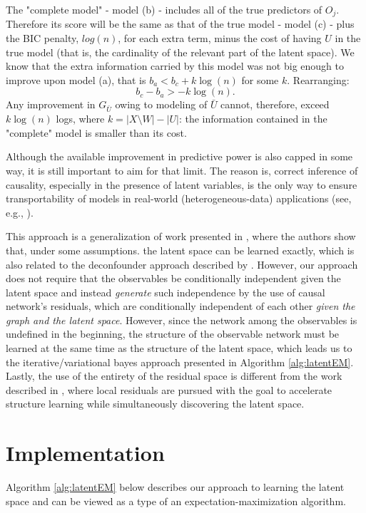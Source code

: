 \documentclass[letterpaper]{article}
\begin{document}
The "complete model" - model (b) - includes all of the true predictors of $O_j$.  Therefore its score will be the same as that of the true model - model (c) - plus the BIC penalty, $log(n)$, for each extra term, minus the cost of having $U$ in the true model (that is, the cardinality of the relevant part of the latent space).  We know that the extra information carried by this model was not big enough to improve upon model (a), that is $b_a < b_c + k \log(n)$ for some $k$.  Rearranging:
\begin{equation}
    b_c - b_a > -k\log(n).
    \label{eq:ceilingTheorem}
\end{equation}
Any improvement in $G_{\bar{U}}$ owing to modeling of $\bar{U}$ cannot, therefore, exceed $k\log(n)$ logs, where $k = |X \setminus W| - |U|$: the information contained in the "complete" model is smaller than its cost.

Although the available improvement in predictive power is also capped in some way, it is still important to aim for that limit.  The reason is, correct inference of causality, especially in the presence of latent variables, is the only way to ensure transportability of models in real-world (heterogeneous-data) applications (see, e.g., \cite{bareinboim_causal_2016}).

This approach is a generalization of work presented in \cite{anandkumar_learning_2013}, where the authors show that, under some assumptions. the latent space can be learned exactly, which is also related to the deconfounder approach described by \cite{wang_deconfounder_2019}.  However, our approach does not require that the observables be conditionally independent given the latent space and instead \textit{generate} such independence by the use of causal network's residuals, which are conditionally independent of each other \textit{given the graph and the latent space}.  However, since the network among the observables is undefined in the beginning, the structure of the observable network must be learned at the same time as the structure of the latent space, which leads us to the iterative/variational bayes approach presented in Algorithm \ref{alg:latentEM}.  Lastly, the use of the entirety of the residual space is different from the work described in \cite{elidan_ideal_2007}, where local residuals are pursued with the goal to accelerate structure learning while simultaneously discovering the latent space.

\section{Implementation}
Algorithm \ref{alg:latentEM} below describes our approach to learning the latent space and can be viewed as a type of an expectation-maximization algorithm.
\end{document}
